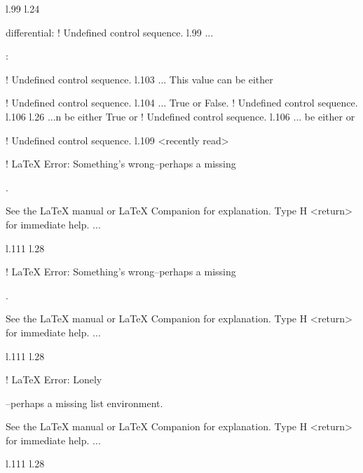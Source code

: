 {{{{{{l.99 l.24     \item \xmlNode
                            {differential}: \xmlDesc
! Undefined control sequence.
l.99 ...    \item {}: \xmlDesc
                                                  
! Undefined control sequence.
l.103 ...      This value can be either \xmlString
                                                  
! Undefined control sequence.
l.104 ...                     {True} or \xmlString
                                                  {False}.
! Undefined control sequence.
l.106 l.26 ...n be either \xmlString
                                    {True} or \xmlString
! Undefined control sequence.
l.106 ... be either  or \xmlString
                                                  
! Undefined control sequence.
l.109 <recently read> \xmlNode
                              

! LaTeX Error: Something's wrong--perhaps a missing \item.

See the LaTeX manual or LaTeX Companion for explanation.
Type  H <return>  for immediate help.
 ...                                              
                                                  
l.111 l.28     \item \xmlNode
                             

! LaTeX Error: Something's wrong--perhaps a missing \item.

See the LaTeX manual or LaTeX Companion for explanation.
Type  H <return>  for immediate help.
 ...                                              
                                                  
l.111 l.28     \item \xmlNode
                             

! LaTeX Error: Lonely \item--perhaps a missing list environment.

See the LaTeX manual or LaTeX Companion for explanation.
Type  H <return>  for immediate help.
 ...                                              
                                                  
l.111 l.28     \item \xmlNode
                             
}}}}}}
